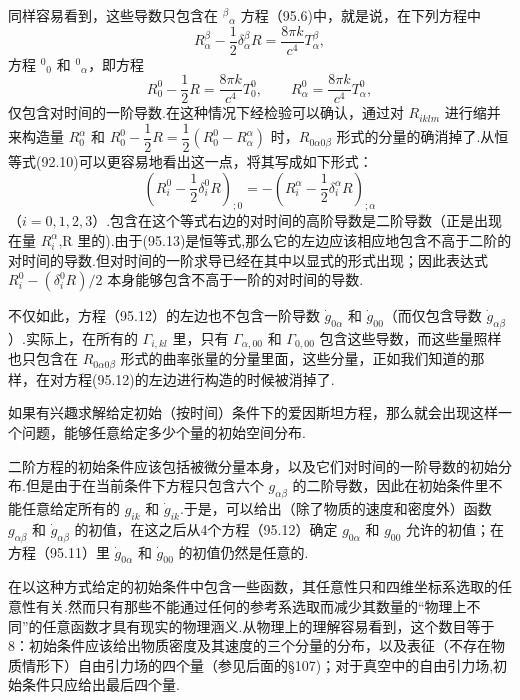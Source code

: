 同样容易看到，这些导数只包含在 $^{\beta}{}_{\alpha}$ 方程（95.6)中，就是说，在下列方程中
\begin{equation}
  R^{\beta}_{\alpha}-\frac{1}{2}\delta^{\beta}_{\alpha}R
  =\frac{8\pi k}{c^4}T^{\beta}_{\alpha},
\end{equation}
方程 $^{0}{}_{0}$ 和 $^{0}{}_{\alpha}$，即方程
\begin{equation}
  R^0_0-\frac{1}{2}R=\frac{8\pi k}{c^4}T^0_0,\qquad
  R^0_{\alpha}=\frac{8\pi k}{c^4}T^0_{\alpha},
\end{equation}
仅包含对时间的一阶导数.在这种情况下经检验可以确认，通过对 $R_{iklm}$ 进行缩并来构造量 $R^{\alpha}_0$ 和 $R^0_0-\dfrac{1}{2}R=\dfrac{1}{2}\left(R^0_0-R^{\alpha}_{\alpha}\right)$ 时，$R_{0\alpha 0\beta}$ 形式的分量的确消掉了.从恒等式(92.10)可以更容易地看出这一点，将其写成如下形式：
\begin{equation}
  \left(R^0_i-\frac{1}{2}\delta^0_iR\right)_{;0}
  =-\left(R^{\alpha}_i-\frac{1}{2}\delta^{\alpha}_iR\right)_{;\alpha}
\end{equation}
（$i=0,1,2,3$）.包含在这个等式右边的对时间的高阶导数是二阶导数（正是出现在量 $R^{\alpha}_i$,R 里的).由于(95.13)是恒等式,那么它的左边应该相应地包含不高于二阶的对时间的导数.但对时间的一阶求导已经在其中以显式的形式出现；因此表达式 $R^0_i-(\delta^0_iR)/2$ 本身能够包含不高于一阶的对时间的导数.

不仅如此，方程（95.12）的左边也不包含一阶导数 $\dot{g}_{0\alpha}$ 和 $\dot{g}_{00}$（而仅包含导数 $\dot{g}_{\alpha\beta}$）.实际上，在所有的 $\Gamma_{i,kl}$ 里，只有 $\Gamma_{\alpha,00}$ 和 $\Gamma_{0,00}$ 包含这些导数，而这些量照样也只包含在 $R_{0\alpha 0\beta}$ 形式的曲率张量的分量里面，这些分量，正如我们知道的那样，在对方程(95.12)的左边进行构造的时候被消掉了.

如果有兴趣求解给定初始（按时间）条件下的爱因斯坦方程，那么就会出现这样一个问题，能够任意给定多少个量的初始空间分布.

二阶方程的初始条件应该包括被微分量本身，以及它们对时间的一阶导数的初始分布.但是由于在当前条件下方程只包含六个 $g_{\alpha\beta}$ 的二阶导数，因此在初始条件里不能任意给定所有的 $g_{ik}$ 和 $\dot{g}_{ik}$.于是，可以给出（除了物质的速度和密度外）函数 $g_{\alpha\beta}$ 和 $\dot{g}_{\alpha\beta}$ 的初值，在这之后从4个方程（95.12）确定 $g_{0\alpha}$ 和 $g_{00}$ 允许的初值；在方程（95.11）里 $\dot{g}_{0\alpha}$ 和 $\dot{g}_{00}$ 的初值仍然是任意的.

在以这种方式给定的初始条件中包含一些函数，其任意性只和四维坐标系选取的任意性有关.然而只有那些不能通过任何的参考系选取而减少其数量的“物理上不同”的任意函数才具有现实的物理涵义.从物理上的理解容易看到，这个数目等于 8：初始条件应该给出物质密度及其速度的三个分量的分布，以及表征（不存在物质情形下）自由引力场的四个量（参见后面的§107)；对于真空中的自由引力场,初始条件只应给出最后四个量.

